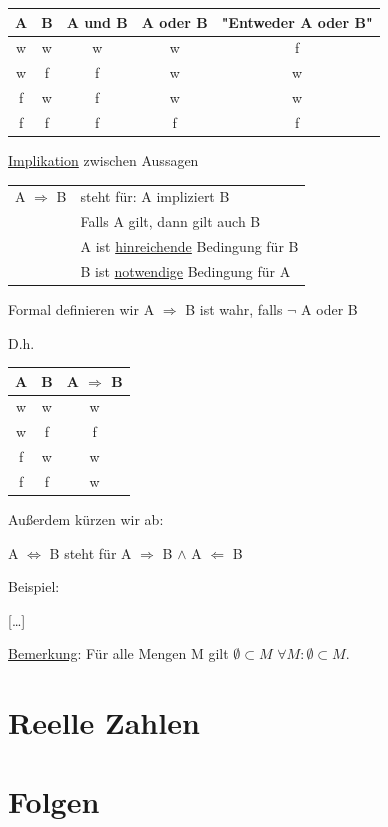 \documentclass[12pt,a4paper]{article} %
\newcounter{Satz}[section]
\begin{document}
\begin{tabular}{c | c | c | c | c}
	A & B & A und B & A oder B & "{}Entweder A oder B" \\ \hline
	w & w & w & w & f \\
	w & f & f & w & w \\
	f & w & f & w & w \\
	f & f & f & f & f
\end{tabular}

\underline{Implikation} zwischen Aussagen

\begin{tabular}{l l}
	A $\Rightarrow$ B & steht für: A impliziert B \\
	 & Falls A gilt, dann gilt auch B \\
	 & A ist \underline{hinreichende} Bedingung für B \\
	 & B ist \underline{notwendige} Bedingung für A
\end{tabular}

Formal definieren wir A $\Rightarrow$ B ist wahr, falls $\neg$ A oder B

D.h.
\begin{tabular}{c | c | c}
	A & B & A $\Rightarrow$ B \\ \hline
	w & w & w \\
	w & f & f \\
	f & w & w \\
	f & f & w
\end{tabular}

Außerdem kürzen wir ab:

A $\Leftrightarrow$ B steht für A $\Rightarrow$ B $\land$ A $\Leftarrow$ B

Beispiel:

[\dots]

\underline{Bemerkung}:\newline
Für alle Mengen M gilt $\emptyset \subset M$ \newline
$\forall M: \emptyset \subset M$.

\newpage

\section{Reelle Zahlen}

\newpage

\section{Folgen}
\end{document}
